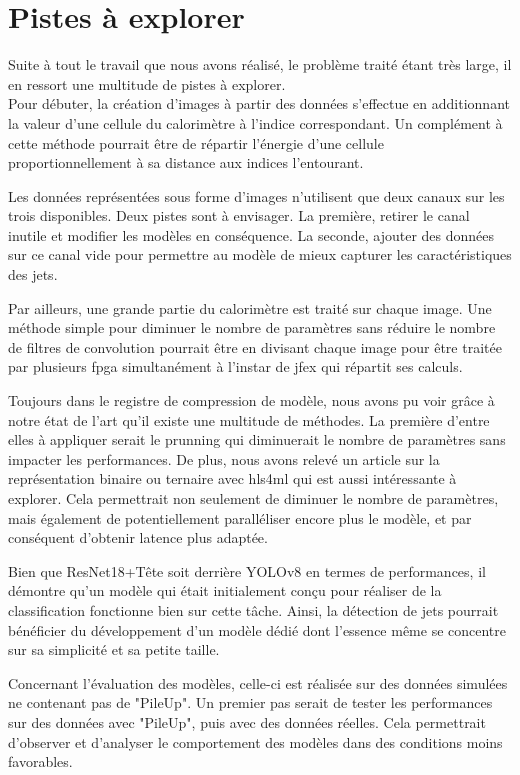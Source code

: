 \section{Pistes à explorer}

Suite à tout le travail que nous avons réalisé, le problème traité étant très large, il en ressort une multitude de pistes à explorer.\\

Pour débuter, la création d'images à partir des données s'effectue en additionnant la valeur d'une cellule du calorimètre à l'indice correspondant. Un complément à cette méthode pourrait être de répartir l'énergie d'une cellule proportionnellement à sa distance aux indices l'entourant.

Les données représentées sous forme d'images n'utilisent que deux canaux sur les trois disponibles. Deux pistes sont à envisager. La première, retirer le canal inutile et modifier les modèles en conséquence. La seconde, ajouter des données sur ce canal vide pour permettre au modèle de mieux capturer les caractéristiques des jets.

Par ailleurs, une grande partie du calorimètre est traité sur chaque image. Une méthode simple pour diminuer le nombre de paramètres sans réduire le nombre de filtres de convolution pourrait être en divisant chaque image pour être traitée par plusieurs \acrshort{fpga} simultanément à l'instar de \acrshort{jfex} qui répartit ses calculs.

Toujours dans le registre de compression de modèle, nous avons pu voir grâce à notre état de l'art qu'il existe une multitude de méthodes. La première d'entre elles à appliquer serait le prunning qui diminuerait le nombre de paramètres sans impacter les performances. De plus, nous avons relevé un article sur la représentation binaire ou ternaire avec \acrshort{hls4ml} qui est aussi intéressante à explorer. Cela permettrait non seulement de diminuer le nombre de paramètres, mais également de potentiellement paralléliser encore plus le modèle, et par conséquent d'obtenir latence plus adaptée.

Bien que ResNet18+Tête soit derrière YOLOv8 en termes de performances, il démontre qu'un modèle qui était initialement conçu pour réaliser de la classification fonctionne bien sur cette tâche. Ainsi, la détection de jets pourrait bénéficier du développement d'un modèle dédié dont l'essence même se concentre sur sa simplicité et sa petite taille.

Concernant l'évaluation des modèles, celle-ci est réalisée sur des données simulées ne contenant pas de "PileUp". Un premier pas serait de tester les performances sur des données avec "PileUp", puis avec des données réelles. Cela permettrait d'observer et d'analyser le comportement des modèles dans des conditions moins favorables.

